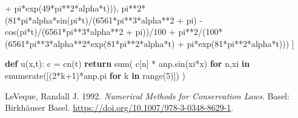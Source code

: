 \documentclass[
  11pt,
]{article}
\newenvironment{Shaded}{}{}
\newcommand{\BuiltInTok}[1]{#1}
\newcommand{\ControlFlowTok}[1]{\textcolor[rgb]{0.00,0.44,0.13}{\textbf{#1}}}
\newcommand{\DecValTok}[1]{\textcolor[rgb]{0.25,0.63,0.44}{#1}}
\newcommand{\KeywordTok}[1]{\textcolor[rgb]{0.00,0.44,0.13}{\textbf{#1}}}
\newcommand{\NormalTok}[1]{#1}
\newcommand{\OperatorTok}[1]{\textcolor[rgb]{0.40,0.40,0.40}{#1}}
\newlength{\cslhangindent}
\newenvironment{CSLReferences}[3] %
 {%
  \setlength{\parindent}{0pt}
  \ifodd #1 \everypar{\setlength{\hangindent}{\cslhangindent}}\ignorespaces\fi
  \ifnum #2 > 0
  \setlength{\parskip}{#2\baselineskip}
  \fi
 }%
 {}
\begin{document}
\begin{Shaded}
\begin{Highlighting}[]
            \OperatorTok{+}\NormalTok{ pi}\OperatorTok{*}\NormalTok{exp(}\DecValTok{49}\OperatorTok{*}\NormalTok{pi}\OperatorTok{**}\DecValTok{2}\OperatorTok{*}\NormalTok{alpha}\OperatorTok{*}\NormalTok{t))), }
\NormalTok{        pi}\OperatorTok{**}\DecValTok{2}\OperatorTok{*}\NormalTok{(}\DecValTok{81}\OperatorTok{*}\NormalTok{pi}\OperatorTok{*}\NormalTok{alpha}\OperatorTok{*}\NormalTok{sin(pi}\OperatorTok{*}\NormalTok{t)}\OperatorTok{/}\NormalTok{(}\DecValTok{6561}\OperatorTok{*}\NormalTok{pi}\OperatorTok{**}\DecValTok{3}\OperatorTok{*}\NormalTok{alpha}\OperatorTok{**}\DecValTok{2} \OperatorTok{+}\NormalTok{ pi) }
            \OperatorTok{{-}}\NormalTok{ cos(pi}\OperatorTok{*}\NormalTok{t)}\OperatorTok{/}\NormalTok{(}\DecValTok{6561}\OperatorTok{*}\NormalTok{pi}\OperatorTok{**}\DecValTok{3}\OperatorTok{*}\NormalTok{alpha}\OperatorTok{**}\DecValTok{2} \OperatorTok{+}\NormalTok{ pi))}\OperatorTok{/}\DecValTok{100} 
            \OperatorTok{+}\NormalTok{ pi}\OperatorTok{**}\DecValTok{2}\OperatorTok{/}\NormalTok{(}\DecValTok{100}\OperatorTok{*}\NormalTok{(}\DecValTok{6561}\OperatorTok{*}\NormalTok{pi}\OperatorTok{**}\DecValTok{3}\OperatorTok{*}\NormalTok{alpha}\OperatorTok{**}\DecValTok{2}\OperatorTok{*}\NormalTok{exp(}\DecValTok{81}\OperatorTok{*}\NormalTok{pi}\OperatorTok{**}\DecValTok{2}\OperatorTok{*}\NormalTok{alpha}\OperatorTok{*}\NormalTok{t) }
            \OperatorTok{+}\NormalTok{ pi}\OperatorTok{*}\NormalTok{exp(}\DecValTok{81}\OperatorTok{*}\NormalTok{pi}\OperatorTok{**}\DecValTok{2}\OperatorTok{*}\NormalTok{alpha}\OperatorTok{*}\NormalTok{t)))}
\NormalTok{     ]}

\KeywordTok{def}\NormalTok{ u(x,t):}
\NormalTok{    c }\OperatorTok{=}\NormalTok{ cn(t)}
    \ControlFlowTok{return} \BuiltInTok{sum}\NormalTok{( }
\NormalTok{        c[n] }\OperatorTok{*}\NormalTok{ anp.sin(xi}\OperatorTok{*}\NormalTok{x)}
            \ControlFlowTok{for}\NormalTok{ n,xi }\KeywordTok{in} \BuiltInTok{enumerate}\NormalTok{([(}\DecValTok{2}\OperatorTok{*}\NormalTok{k}\OperatorTok{+}\DecValTok{1}\NormalTok{)}\OperatorTok{*}\NormalTok{anp.pi }\ControlFlowTok{for}\NormalTok{ k }\KeywordTok{in} \BuiltInTok{range}\NormalTok{(}\DecValTok{5}\NormalTok{)])}
\NormalTok{    ) }
\end{Highlighting}
\end{Shaded}

\hypertarget{refs}{}
\begin{CSLReferences}{1}{0}
\leavevmode{}%
LeVeque, Randall J. 1992. \emph{Numerical {Methods} for {Conservation
Laws}}. {Basel}: {Birkhäuser Basel}.
\url{https://doi.org/10.1007/978-3-0348-8629-1}.

\end{CSLReferences}
\end{document}
